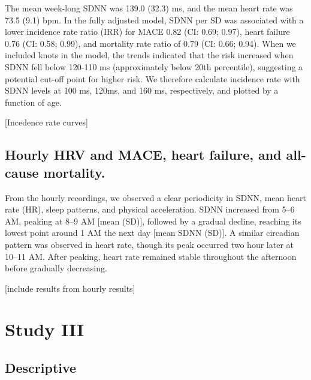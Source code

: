\documentclass[
  a4paper,
  headsepline=true,
  open=any]{scrbook}
\begin{document}
The mean week-long SDNN was 139.0 (32.3) ms, and the mean heart rate was
73.5 (9.1) bpm. In the fully adjusted model, SDNN per SD was associated
with a lower incidence rate ratio (IRR) for MACE 0.82 (CI: 0.69; 0.97),
heart failure 0.76 (CI: 0.58; 0.99), and mortality rate ratio of 0.79
(CI: 0.66; 0.94). When we included knots in the model, the trends
indicated that the risk increased when SDNN fell below 120-110 ms
(approximately below 20th percentile), suggesting a potential cut-off
point for higher risk. We therefore calculate incidence rate with SDNN
levels at 100 ms, 120ms, and 160 ms, respectively, and plotted by a
function of age.

{[}Incedence rate curves{]}

\hypertarget{hourly-hrv-and-mace-heart-failure-and-all-cause-mortality.}{%
\section{Hourly HRV and MACE, heart failure, and all-cause
mortality.}\label{hourly-hrv-and-mace-heart-failure-and-all-cause-mortality.}}

From the hourly recordings, we observed a clear periodicity in SDNN,
mean heart rate (HR), sleep patterns, and physical acceleration. SDNN
increased from 5--6 AM, peaking at 8--9 AM {[}mean (SD){]}, followed by
a gradual decline, reaching its lowest point around 1 AM the next day
{[}mean SDNN (SD){]}. A similar circadian pattern was observed in heart
rate, though its peak occurred two hour later at 10--11 AM. After
peaking, heart rate remained stable throughout the afternoon before
gradually decreasing.

{[}include results from hourly results{]}


\hypertarget{study-iii}{%
\chapter{Study III}\label{study-iii}}

\hypertarget{descriptive-2}{%
\section{Descriptive}\label{descriptive-2}}
\end{document}

